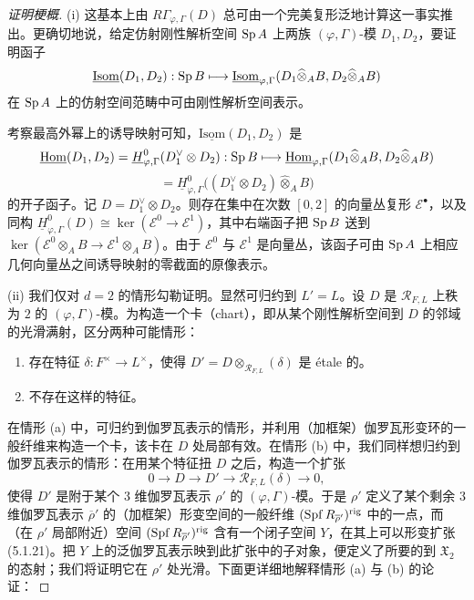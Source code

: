 \begin{proof}[证明梗概]
(i) 这基本上由 $R\Gamma_{\varphi,\Gamma}(D)$ 总可由一个完美复形泛地计算这一事实推出。更确切地说，给定仿射刚性解析空间 $\operatorname{Sp} A$ 上两族 $(\varphi,\Gamma)$-模 $D_1,D_2$，要证明函子
\[
\underline{\mathrm{Isom}}(D_1,D_2):\operatorname{Sp} B\longmapsto\underline{\mathrm{Isom}}_{\varphi,\Gamma}(D_1\widehat{\otimes}_AB,D_2\widehat{\otimes}_AB)
\]
在 $\operatorname{Sp} A$ 上的仿射空间范畴中可由刚性解析空间表示。

考察最高外幂上的诱导映射可知，$\underline{\mathrm{Isom}}(D_1,D_2)$ 是
\[
\underline{\operatorname{Hom}}(D_1,D_2)=\underline{H}^0_{\varphi,\Gamma}(D_1^\vee\otimes D_2):\operatorname{Sp} B\longmapsto\underline{\operatorname{Hom}}_{\varphi,\Gamma}(D_1\widehat{\otimes}_AB,D_2\widehat{\otimes}_AB)
\]
\[
{}=\underline{H}^0_{\varphi,\Gamma}\bigl((D_1^\vee\otimes D_2)\widehat{\otimes}_AB\bigr)
\]
的开子函子。记 $D=D_1^\vee\otimes D_2$。则存在集中在次数 $[0,2]$ 的向量丛复形 $\mathcal{E}^\bullet$，以及同构 $\underline{H}^0_{\varphi,\Gamma}(D)\cong\ker(\mathcal{E}^0\to\mathcal{E}^1)$，其中右端函子把 $\operatorname{Sp} B$ 送到 $\ker(\mathcal{E}^0\otimes_AB\to\mathcal{E}^1\otimes_AB)$。由于 $\mathcal{E}^0$ 与 $\mathcal{E}^1$ 是向量丛，该函子可由 $\operatorname{Sp} A$ 上相应几何向量丛之间诱导映射的零截面的原像表示。

(ii) 我们仅对 $d=2$ 的情形勾勒证明。显然可归约到 $L'=L$。设 $D$ 是 $\mathcal{R}_{F,L}$ 上秩为 $2$ 的 $(\varphi,\Gamma)$-模。为构造一个卡（chart），即从某个刚性解析空间到 $D$ 的邻域的光滑满射，区分两种可能情形：
\begin{enumerate}[label=(\alph*),leftmargin=2.2em,itemsep=0.15em]
\item 存在特征 $\delta:F^\times\to L^\times$，使得 $D'=D\otimes_{\mathcal{R}_{F,L}}(\delta)$ 是 étale 的。
\item 不存在这样的特征。
\end{enumerate}
在情形 (a) 中，可归约到伽罗瓦表示的情形，并利用（加框架）伽罗瓦形变环的一般纤维来构造一个卡，该卡在 $D$ 处局部有效。在情形 (b) 中，我们同样想归约到伽罗瓦表示的情形：在用某个特征扭 $D$ 之后，构造一个扩张
\begin{equation}
0\to D\to D'\to\mathcal{R}_{F,L}(\delta)\to0,\tag{5.1.21}
\end{equation}
使得 $D'$ 是附于某个 $3$ 维伽罗瓦表示 $\rho'$ 的 $(\varphi,\Gamma)$-模。于是 $\rho'$ 定义了某个剩余 $3$ 维伽罗瓦表示 $\overline{\rho}'$ 的（加框架）形变空间的一般纤维 $(\operatorname{Spf} R_{\overline{\rho}'})^{\mathrm{rig}}$ 中的一点，而（在 $\rho'$ 局部附近）空间 $(\operatorname{Spf} R_{\overline{\rho}'})^{\mathrm{rig}}$ 含有一个闭子空间 $Y$，在其上可以形变扩张 (5.1.21)。把 $Y$ 上的泛伽罗瓦表示映到此扩张中的子对象，便定义了所要的到 $\mathfrak{X}_2$ 的态射；我们将证明它在 $\rho'$ 处光滑。下面更详细地解释情形 (a) 与 (b) 的论证：


\end{proof}
